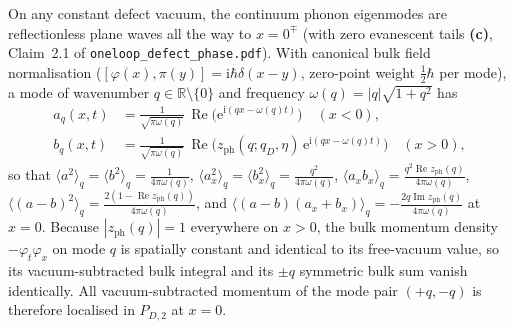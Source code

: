 \documentclass[11pt,a4paper]{article}
\newcommand{\Lc}{\textsf{\textbf{(c)}}}
\newcommand{\ii}{\mathrm{i}}
\newcommand{\ee}{\mathrm{e}}
\newcommand{\hb}{\hbar}
\newcommand{\Rea}{\operatorname{Re}}
\newcommand{\Ima}{\operatorname{Im}}
\theoremstyle{remark}
\begin{document}
On any constant defect vacuum, the continuum phonon eigenmodes are reflectionless
plane waves all the way to $x=0^\mp$ (with zero evanescent tails \Lc, Claim~2.1
of \texttt{oneloop\_\allowbreak defect\_\allowbreak phase.pdf}). With canonical bulk field normalisation
($[\varphi(x),\pi(y)] = \ii\hb\delta(x-y)$, zero-point weight $\frac{1}{2}\hb$ per
mode), a mode of wavenumber $q \in \mathbb{R}\setminus\{0\}$ and frequency
$\omega(q) = |q|\sqrt{1+q^2}$ has
\begin{align}\label{eq:canon_phonon}
  a_q(x,t) &= \frac{1}{\sqrt{\pi\omega(q)}}\,\Rea\!\big(\ee^{\ii(qx-\omega(q)t)}\big) \quad (x<0), \nonumber\\
  b_q(x,t) &= \frac{1}{\sqrt{\pi\omega(q)}}\,\Rea\!\big(z_{\mathrm{ph}}(q;q_D,\eta)\,\ee^{\ii(qx-\omega(q)t)}\big) \quad (x>0),
\end{align}
so that $\langle a^2\rangle_q = \langle b^2\rangle_q = \frac{1}{4\pi\omega(q)}$,
$\langle a_x^2\rangle_q = \langle b_x^2\rangle_q = \frac{q^2}{4\pi\omega(q)}$,
$\langle a_x b_x\rangle_q = \frac{q^2\Rea z_{\mathrm{ph}}(q)}{4\pi\omega(q)}$,
$\langle (a-b)^2\rangle_q = \frac{2(1-\Rea z_{\mathrm{ph}}(q))}{4\pi\omega(q)}$,
and $\langle (a-b)(a_x+b_x)\rangle_q = -\frac{2q\Ima z_{\mathrm{ph}}(q)}{4\pi\omega(q)}$
at $x=0$. Because $|z_{\mathrm{ph}}(q)| = 1$ everywhere on $x>0$, the bulk
momentum density $-\varphi_t\varphi_x$ on mode $q$ is spatially constant and
identical to its free-vacuum value, so its vacuum-subtracted bulk integral and
its $\pm q$ symmetric bulk sum vanish identically. All vacuum-subtracted
momentum of the mode pair $(+q,-q)$ is therefore localised in $P_{D,2}$ at $x=0$.
\end{document}
